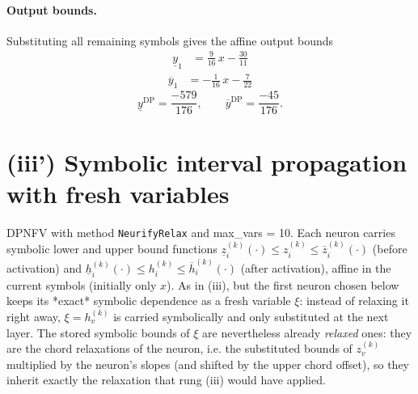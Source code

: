 \documentclass[11pt]{article}
\begin{document}
\paragraph{Output bounds.}
Substituting all remaining symbols gives the affine output bounds
\begin{align*}
\underline{y}_{1} &= \frac{9}{16}\,x - \frac{30}{11}
\end{align*}
\begin{align*}
\overline{y}_{1} &= -\frac{1}{16}\,x - \frac{7}{22}
\end{align*}
\begin{equation*}
\underline{y}^{\text{DP}} = \frac{-579}{176}, \qquad \overline{y}^{\text{DP}} = \frac{-45}{176}.
\end{equation*}

\section{(iii') Symbolic interval propagation with fresh variables}
DPNFV with method \texttt{NeurifyRelax} and max\_vars = 10. Each neuron carries symbolic lower and upper bound functions
$\underline{z}^{(k)}_i(\cdot) \le z^{(k)}_i \le \overline{z}^{(k)}_i(\cdot)$ (before activation)
and $\underline{h}^{(k)}_i(\cdot) \le h^{(k)}_i \le \overline{h}^{(k)}_i(\cdot)$ (after activation),
affine in the current symbols (initially only $x$).
As in (iii), but the first neuron chosen below keeps its *exact*
symbolic dependence as a fresh variable $\xi$: instead of relaxing it right away, $\xi = h^{(k)}_v$
is carried symbolically and only substituted at the next layer. The stored symbolic bounds of $\xi$
are nevertheless already \emph{relaxed} ones: they are the chord relaxations of the neuron, i.e.
the substituted bounds of $z^{(k)}_v$ multiplied by the neuron's slopes (and shifted by the upper
chord offset), so they inherit exactly the relaxation that rung (iii) would have applied.
\end{document}
